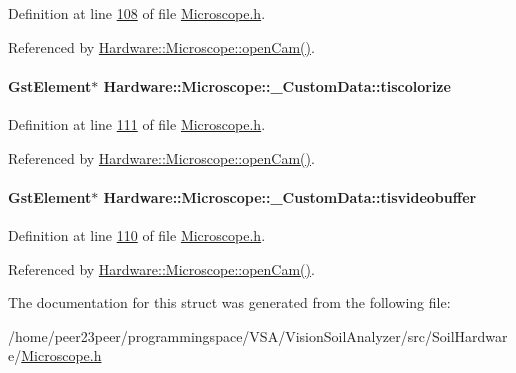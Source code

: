 Definition at line \hyperlink{_microscope_8h_source_l00108}{108} of file \hyperlink{_microscope_8h_source}{Microscope.\+h}.



Referenced by \hyperlink{_microscope_8cpp_source_l00167}{Hardware\+::\+Microscope\+::open\+Cam()}.

\hypertarget{struct_hardware_1_1_microscope_1_1___custom_data_aead275427306139fd257703992709499}{}
\paragraph[{tiscolorize}]{\setlength{\rightskip}{0pt plus 5cm}Gst\+Element$\ast$ Hardware\+::\+Microscope\+::\+\_\+\+Custom\+Data\+::tiscolorize}\label{struct_hardware_1_1_microscope_1_1___custom_data_aead275427306139fd257703992709499}


Definition at line \hyperlink{_microscope_8h_source_l00111}{111} of file \hyperlink{_microscope_8h_source}{Microscope.\+h}.



Referenced by \hyperlink{_microscope_8cpp_source_l00167}{Hardware\+::\+Microscope\+::open\+Cam()}.

\hypertarget{struct_hardware_1_1_microscope_1_1___custom_data_a22c00ed28d0ebc1418b096f36d8f2d50}{}
\paragraph[{tisvideobuffer}]{\setlength{\rightskip}{0pt plus 5cm}Gst\+Element$\ast$ Hardware\+::\+Microscope\+::\+\_\+\+Custom\+Data\+::tisvideobuffer}\label{struct_hardware_1_1_microscope_1_1___custom_data_a22c00ed28d0ebc1418b096f36d8f2d50}


Definition at line \hyperlink{_microscope_8h_source_l00110}{110} of file \hyperlink{_microscope_8h_source}{Microscope.\+h}.



Referenced by \hyperlink{_microscope_8cpp_source_l00167}{Hardware\+::\+Microscope\+::open\+Cam()}.



The documentation for this struct was generated from the following file\+:\begin{DoxyCompactItemize}
\item 
/home/peer23peer/programmingspace/\+V\+S\+A/\+Vision\+Soil\+Analyzer/src/\+Soil\+Hardware/\hyperlink{_microscope_8h}{Microscope.\+h}\end{DoxyCompactItemize}
